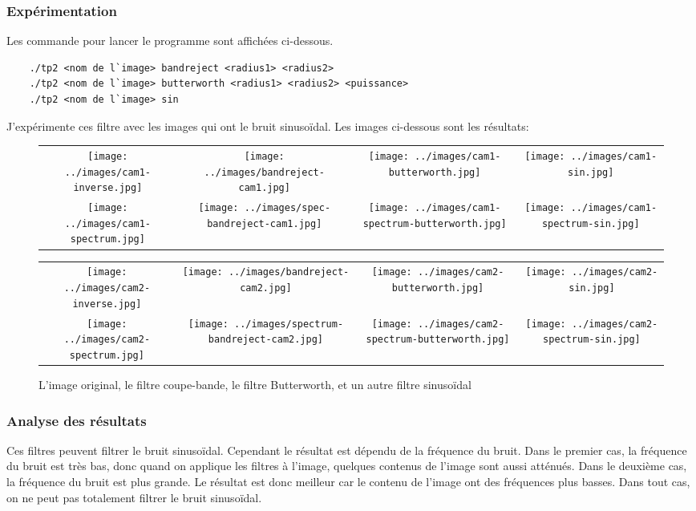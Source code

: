 \documentclass[paper=a4, fontsize=11pt]{scrartcl}	%
\begin{document}
\subsubsection{Expérimentation}
Les commande pour lancer le programme sont affichées ci-dessous.
\begin{lstlisting}
	./tp2 <nom de l`image> bandreject <radius1> <radius2>
	./tp2 <nom de l`image> butterworth <radius1> <radius2> <puissance> 
	./tp2 <nom de l`image> sin
\end{lstlisting}
J'expérimente ces filtre avec les images qui ont le bruit sinusoïdal. Les images ci-dessous sont les résultats:
\newpage
\begin{figure}[h!]
	\begin{center}
		\begin{tabular}[h]{cccc}
		\texttt{[image: ../images/cam1-inverse.jpg]}&
		\texttt{[image: ../images/bandreject-cam1.jpg]}&
		\texttt{[image: ../images/cam1-butterworth.jpg]}&
		\texttt{[image: ../images/cam1-sin.jpg]}\\
		\texttt{[image: ../images/cam1-spectrum.jpg]}&		
		\texttt{[image: ../images/spec-bandreject-cam1.jpg]}&
		\texttt{[image: ../images/cam1-spectrum-butterworth.jpg]}&
		\texttt{[image: ../images/cam1-spectrum-sin.jpg]}
		\end{tabular}
		\begin{tabular}[h]{cccc}
		\texttt{[image: ../images/cam2-inverse.jpg]}&
		\texttt{[image: ../images/bandreject-cam2.jpg]}&
		\texttt{[image: ../images/cam2-butterworth.jpg]}&
		\texttt{[image: ../images/cam2-sin.jpg]}\\
		\texttt{[image: ../images/cam2-spectrum.jpg]}&		
		\texttt{[image: ../images/spectrum-bandreject-cam2.jpg]}&
		\texttt{[image: ../images/cam2-spectrum-butterworth.jpg]}&
		\texttt{[image: ../images/cam2-spectrum-sin.jpg]}
		\end{tabular}

	\end{center}
	\caption{L'image original, le filtre coupe-bande, le filtre Butterworth, et un autre filtre sinusoïdal}	
\end{figure}
\newpage
\subsubsection{Analyse des résultats}
Ces filtres peuvent filtrer le bruit sinusoïdal. Cependant le résultat est dépendu de la fréquence du bruit. Dans le premier cas, la fréquence du bruit est très bas, donc quand on applique les filtres à l'image, quelques contenus de l'image sont aussi atténués. Dans le deuxième cas, la fréquence du bruit est plus grande. Le résultat est donc meilleur car le contenu de l'image ont des fréquences plus basses. Dans tout cas, on ne peut pas totalement filtrer le bruit sinusoïdal.
\end{document}
